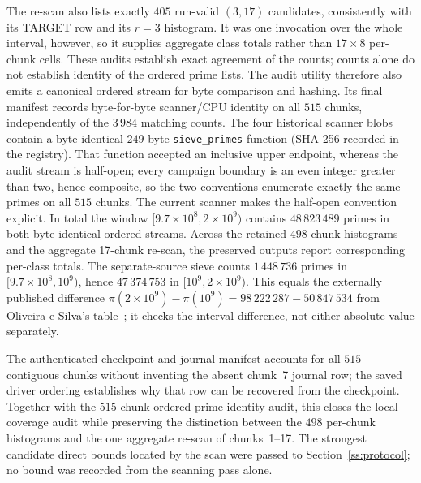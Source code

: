 The re-scan also lists exactly $405$ run-valid $(3,17)$ candidates, consistently
with its TARGET row and its $r=3$ histogram.  It was one invocation over the
whole interval, however, so it supplies aggregate class totals rather than
$17\times8$ per-chunk cells.  These audits establish exact agreement of the
counts; counts alone do not establish
identity of the ordered prime lists.  The audit utility therefore also emits a
canonical ordered stream for byte comparison and hashing.  Its final manifest
records byte-for-byte scanner/CPU identity on all $515$ chunks, independently
of the $3\,984$ matching counts.  The four historical scanner blobs contain a
byte-identical $249$-byte \texttt{sieve\_primes}
function (SHA-256 recorded in the registry).  That function accepted an
inclusive upper endpoint, whereas the audit stream is half-open; every campaign
boundary is an even integer greater than two, hence composite, so the two
conventions enumerate exactly the same primes on all $515$ chunks.  The current
scanner makes the half-open convention explicit.  In total the window
$[9.7\times10^{8},2\times10^{9})$ contains $48\,823\,489$ primes in both
byte-identical ordered streams.  Across the retained $498$-chunk histograms and
the aggregate 17-chunk re-scan, the preserved outputs report corresponding
per-class totals.  The separate-source
sieve counts $1\,448\,736$ primes in
$[9.7\times10^{8},10^{9})$, hence $47\,374\,753$ in
$[10^{9},2\times10^{9})$.  This equals the externally published difference
$\pi(2\times10^{9})-\pi(10^{9})=98\,222\,287-50\,847\,534$ from Oliveira e
Silva's table~\cite{OliveiraSilvaPi}; it checks the interval difference, not
either absolute value separately.

The authenticated checkpoint and journal manifest accounts for all $515$
contiguous chunks without inventing the absent chunk~7 journal row; the saved
driver ordering establishes why that row can be recovered from the checkpoint.
Together with the $515$-chunk ordered-prime identity audit, this closes the
local coverage audit while preserving the distinction between the $498$
per-chunk histograms and the one aggregate re-scan of chunks~1--17.  The
strongest candidate direct bounds located by the scan were passed to
Section~\ref{ss:protocol}; no bound was recorded from the scanning pass alone.
